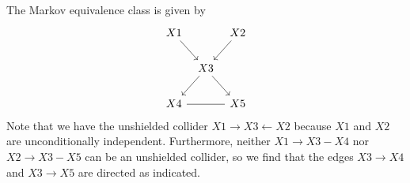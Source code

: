 \documentclass{article}
\begin{document}
\begin{ex}
The Markov equivalence class is given by
\begin{equation*}
\begin{tikzcd}[column sep=tiny]
X1
  \ar{dr}
  &
  {} &
X2
  \ar{dl}
  \\
  {} &
X3
  \ar{dr}
  \ar{dl}
  \\
X4
  \ar[-]{rr}
  &
  {} &
X5
\end{tikzcd}
\end{equation*}
Note that we have the unshielded collider $X1\rightarrow X3\leftarrow X2$ because
$X1$ and $X2$ are unconditionally independent. Furthermore, neither
$X1\to X3-X4$ nor $X2\to X3-X5$ can be an unshielded collider, so we find that
the edges $X3\to X4$ and $X3\to X5$ are directed as indicated.
\end{ex}
\end{document}
